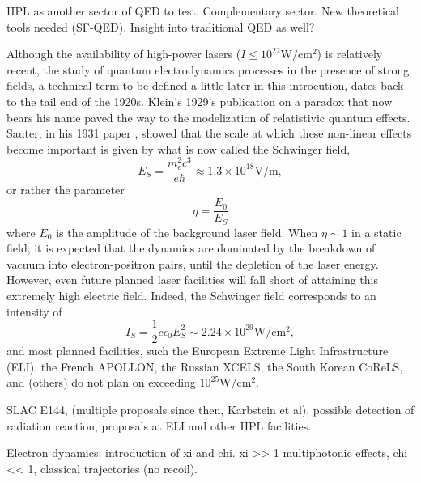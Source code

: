 \documentclass[11pt,SymmetricalJury]{inrsthesis/inrsthesis}
\begin{document}
HPL as another sector of QED to test. Complementary sector. New theoretical tools
needed (SF-QED). Insight into traditional QED as well?

Although the availability of high-power lasers ($I\leq10^{22}\si{\watt\per\cm\squared}$)
is relatively recent, the study of quantum electrodynamics processes in the presence
of strong fields, a technical term to be defined a little later in this introcution,
dates back to the tail end of the 1920s. Klein's 1929's publication \cite{Klein1929} on a paradox
that now bears his name paved the way to the modelization of relatistivic
quantum effects. Sauter, in his 1931 paper \cite{SAU1931}, showed that the scale at which
these non-linear effects become important is given by what is now called
the Schwinger field,
  \begin{equation}
    E_S = \frac{m_e^2c^3}{e\hbar} \approx 1.3\times10^{18}\si{\volt\per\meter},
  \end{equation}
or rather the parameter
  \begin{equation}
    \eta = \frac{E_0}{E_S}
  \end{equation}
where $E_0$ is the amplitude of the background laser field. When $\eta\sim1$
in a static field,
it is expected that the dynamics are dominated by the breakdown of vacuum
into electron-positron pairs, until the depletion of the laser energy.
However, even future planned laser facilities will fall short of attaining
this extremely high electric field. Indeed, the Schwinger field corresponds
to an intensity of
  \begin{equation}
    I_S = \frac{1}{2}c\epsilon_0E_S^2\sim 2.24\times10^{29}\si{\watt\per\cm\squared},
  \end{equation}
and most planned facilities, such the European Extreme Light Infrastructure (ELI),
the French APOLLON, the Russian XCELS, the South Korean CoReLS, and (others)
do not plan on exceeding $10^{25}\si{\watt\per\cm\squared}$. 

SLAC E144, (multiple proposals since then, Karbstein et al), possible
detection of radiation reaction, proposals at ELI and other HPL facilities.

Electron dynamics: introduction of xi and chi. xi >> 1 multiphotonic effects,
chi << 1, classical trajectories (no recoil).
\end{document}
